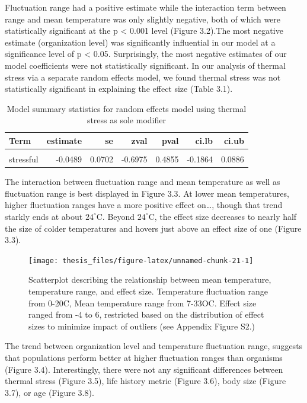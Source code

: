\documentclass[12pt,twoside]{reedthesis}
\begin{document}
Fluctuation range had a positive estimate while the interaction term between range and mean temperature was only slightly negative, both of which were statistically significant at the p \textless{} 0.001 level (Figure 3.2).The most negative estimate (organization level) was significantly influential in our model at a significance level of p \textless{} 0.05. Surprisingly, the most negative estimates of our model coefficients were not statistically significant. In our analysis of thermal stress via a separate random effects model, we found thermal stress was not statistically significant in explaining the effect size (Table 3.1).
\begin{table}[!h]

\caption[Thermal stress model summary statistics]{\label{tab:unnamed-chunk-20}Model summary statistics for random effects model using thermal stress as sole modifier}
\centering
\begin{tabular}[t]{lrrrrrr}
\toprule
\textbf{Term} & \textbf{estimate} & \textbf{se} & \textbf{zval} & \textbf{pval} & \textbf{ci.lb} & \textbf{ci.ub}\\
\midrule
\cellcolor{gray!6}{intercept} & \cellcolor{gray!6}{0.2050} & \cellcolor{gray!6}{0.1846} & \cellcolor{gray!6}{1.1104} & \cellcolor{gray!6}{0.2668} & \cellcolor{gray!6}{-0.1568} & \cellcolor{gray!6}{0.5669}\\
stressful & -0.0489 & 0.0702 & -0.6975 & 0.4855 & -0.1864 & 0.0886\\
\bottomrule
\end{tabular}
\end{table}
\clearpage

The interaction between fluctuation range and mean temperature as well as fluctuation range is best displayed in Figure 3.3. At lower mean temperatures, higher fluctuation ranges have a more positive effect on\ldots{}, though that trend starkly ends at about \(24^{\circ}\)C. Beyond \(24^{\circ}\)C, the effect size decreases to nearly half the size of colder temperatures and hovers just above an effect size of one (Figure 3.3).
\begin{figure}

{\centering \texttt{[image: thesis\_files/figure-latex/unnamed-chunk-21-1]} 

}

\caption[Scatterplot of relationship between range, mean, and effect size]{Scatterplot describing the relationship between mean temperature, temperature range, and effect size. Temperature fluctuation range from 0-20C, Mean temperature range from 7-33OC. Effect size ranged from -4 to 6, restricted based on the distribution of effect sizes to minimize impact of outliers (see Appendix Figure S2.)}\label{fig:unnamed-chunk-21}
\end{figure}
The trend between organization level and temperature fluctuation range, suggests that populations perform better at higher fluctuation ranges than organisms (Figure 3.4). Interestingly, there were not any significant differences between thermal stress (Figure 3.5), life history metric (Figure 3.6), body size (Figure 3.7), or age (Figure 3.8).
\end{document}
